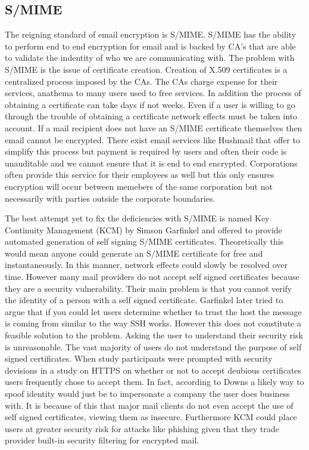 \documentclass[10pt,twocolumn]{article}
\begin{document}
\subsection{S/MIME}
\par The reigning standard of email encryption is S/MIME. S/MIME has the ability to perform end to end encryption for email and is backed by CA's that are able to validate the indentity of who we are communicating with. The problem with S/MIME is the issue of certificate creation. Creation of X.509 certificates is a centralized process imposed by the CAs\cite{garfinkel2005johnny}. The CAs charge expense for their services, anathema to many users used to free services. In addition the process of obtaining a certificate can take days if not weeks. Even if a user is willing to go through the trouble of obtaining a certificate network effects must be taken into account. If a mail recipient does not have an S/MIME certificate themselves then email cannot be encrypted. There exist email services like Hushmail that offer to simplify this process but payment is required by users and often their code is unauditable and we cannot ensure that it is end to end encrypted. Corporations often provide this service for their employees as well but this only ensures encryption will occur between memebers of the same corporation but not necessarily with parties outside the corporate boundaries.
\par The best attempt yet to fix the deficiencies with S/MIME is named Key Continuity Management (KCM) by Simson Garfinkel and offered to provide automated generation of self signing S/MIME certificates\cite{garfinkel2005johnny}. Theoretically this would mean anyone could generate an S/MIME certificate for free and instantaneously. In this manner, network effects could slowly be resolved over time. However many mail providers do not accept self signed certificates because they are a security vulnerability. Their main problem is that you cannot verify the identity of a person with a self signed certificate. Garfinkel later tried to argue that if you could let users determine whether to trust the host the message is coming from similar to the way SSH works\cite{garfinkel2005make}. However this does not constitute a feasible solution to the problem. Asking the user to understand their security risk is unreasonable. The vast majority of users do not understand the purpose of self signed certificates\cite{downs2006decision}. When study participants were prompted with security devisions in a study on HTTPS on whether or not to accept deubious certificates users frequently chose to accept them\cite{callegati2009man}. In fact, according to Downs a likely way to spoof identity would just be to impersonate a company the user does business with\cite{downs2006decision}. It is because of this that major mail clients do not even accept the use of self signed certificates, viewing them as insecure\cite{force-use-of-self,ars-postfix}. Furthermore KCM could place users at greater security risk for attacks like phishing given that they trade provider built-in security filtering for encrypted mail.
\end{document}
